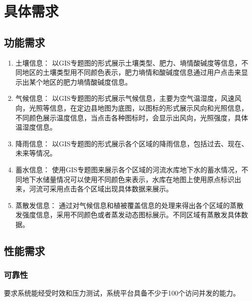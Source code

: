 %
%

\section{具体需求}
\subsection{功能需求}
\begin{enumerate}
	\item   土壤信息：
	以GIS专题图的形式展示土壤类型、肥力、墒情酸碱度等信息，不同地区的土壤类型用不同颜色表示，肥力墒情和酸碱度信息通过用户点击来显示出某个地区的肥力墒情酸碱度信息。
    \item 气候信息：
    以GIS专题图的形式展示气候信息，主要为空气温湿度，风速风向，光照等信息，在定边县地图为底图，以图标的形式展示风向和光照信息，不同颜色展示温度信息，当点击各种图标时，会显示出风向，光照强度，具体温湿度信息。
    \item 降雨信息：
    以GIS专题图的形式展示各个区域的降雨信息，包括过去、现在、未来等情况。
    \item 蓄水信息：
    使用GIS专题图来展示各个区域的河流水库地下水的蓄水情况，不同地下水储量情况可以使用不同颜色来表示，水库在地图上使用原点标识出来，河流可采用点击各个区域出现具体数据来展示。
    \item 蒸散发信息：
    通过对气候信息和植被覆盖信息的处理来得出各个区域的蒸散发强度信息，采用不同颜色或者蒸发动态图标展示。不同区域有蒸散发具体数据。
\end{enumerate}
\subsection{性能需求}
\subsubsection{可靠性}
要求系统能经受时效和压力测试，系统平台具备不少于100个访问并发的能力。
